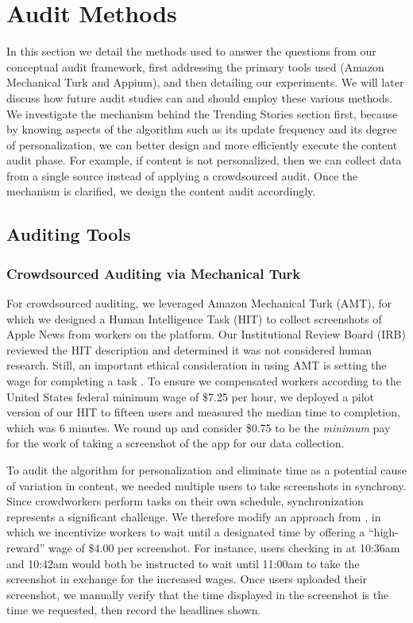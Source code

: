\section{Audit Methods \label{sec:methods}}

In this section we detail the methods used to answer the questions from our conceptual audit framework, first addressing the primary tools used (Amazon Mechanical Turk and Appium), and then detailing our experiments. We will later discuss how future audit studies can and should employ these various methods. We investigate the mechanism behind the Trending Stories section first, because by knowing aspects of the algorithm such as its update frequency and its degree of personalization, we can better design and more efficiently execute the content audit phase. For example, if content is not personalized, then we can collect data from a single source instead of applying a crowdsourced audit. Once the mechanism is clarified, we design the content audit accordingly.

\subsection{Auditing Tools}

\subsubsection{Crowdsourced Auditing via Mechanical Turk}
For crowdsourced auditing, we leveraged Amazon Mechanical Turk (AMT), for which we designed a Human Intelligence Task (HIT) to collect screenshots of Apple News from workers on the platform. Our Institutional Review Board (IRB) reviewed the HIT description and determined it was not considered human research. Still, an important ethical consideration in using AMT is setting the wage for completing a task \citep{Hara2018}. To ensure we compensated workers according to the United States federal minimum wage of \$7.25 per hour, we deployed a pilot version of our HIT to fifteen users and measured the median time to completion, which was 6 minutes. We round up and consider \$0.75 to be the \textit{minimum} pay for the work of taking a  screenshot of the app for our data collection.

To audit the algorithm for personalization and eliminate time as a potential cause of variation in content, we needed multiple users to take screenshots in synchrony. Since crowdworkers perform tasks on their own schedule, synchronization represents a significant challenge. We therefore modify an approach from \citet{Bernstein2012}, in which we incentivize workers to wait until a designated time by offering a ``high-reward'' wage of \$4.00 per screenshot. For instance, users checking in at 10:36am and 10:42am would both be instructed to wait until 11:00am to take the screenshot in exchange for the increased wages. Once users uploaded their screenshot, we manually verify that the time displayed in the screenshot is the time we requested, then record the headlines shown.

